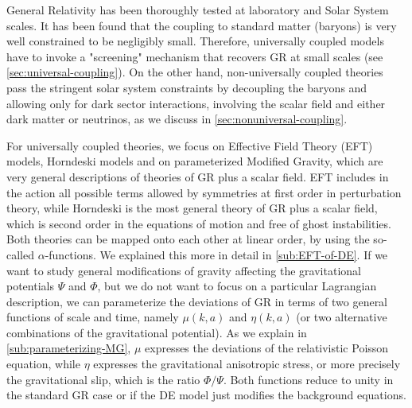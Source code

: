 General Relativity has been thoroughly tested at laboratory and Solar System scales. It has been found that the
coupling to standard matter (baryons) is very well constrained to be negligibly small.
Therefore, universally coupled models have to invoke a "screening" mechanism that recovers GR at small scales (see \cref{sec:universal-coupling}).
On the other hand, non-universally coupled theories pass the stringent solar system constraints by decoupling the baryons
and allowing only for dark sector interactions, involving the scalar field and either dark matter or neutrinos, as we discuss in \cref{sec:nonuniversal-coupling}.

For universally coupled theories, we focus on Effective Field Theory (EFT) models, Horndeski models and on parameterized Modified Gravity, which
are very general descriptions of theories of GR plus a scalar field.
EFT includes in the action all possible terms allowed by symmetries at first order in perturbation theory, while Horndeski is the most general theory
of GR plus a scalar field, which is second order in the equations of motion and free of ghost instabilities.
Both theories can be mapped onto each other at linear order, by using the so-called $\alpha$-functions.
We explained this more in detail in \cref{sub:EFT-of-DE}.
If we want to study general modifications of gravity affecting the gravitational potentials $\Psi$ and $\Phi$, but we do not want to focus on a particular Lagrangian description, we can parameterize the deviations of GR in terms of two
general functions of scale and time, namely $\mu(k,a)$ and $\eta(k,a)$
(or two alternative combinations of the gravitational potential). As we explain in \cref{sub:parameterizing-MG}, $\mu$ expresses the deviations of the relativistic Poisson equation, while $\eta$
expresses the gravitational anisotropic stress, or more precisely the gravitational slip, which is the ratio $\Phi/\Psi$.
Both functions reduce to unity in the standard GR case or if the DE model just modifies the background equations.

